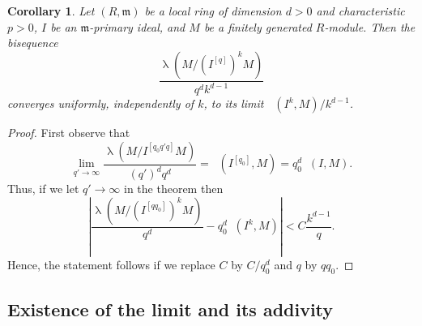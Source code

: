 \documentclass[12pt]{amsart}
\newcommand{\length}{\operatorname{\lambda}}
\newcommand{\mf}[1]{\mathfrak #1}
\DeclareMathOperator{\ehk}{e_{HK}}
\renewcommand{\frq}[1]{{#1}^{[q]}}
\newtheorem{corollary}[theorem]{Corollary}
\theoremstyle{definition}
\theoremstyle{remark}
\numberwithin{theorem}{section}
\numberwithin{equation}{section}
\begin{document}
\begin{corollary}\label{uni}
Let $(R, \mf m)$ be a local ring of dimension $d > 0$ and characteristic $p > 0$, $I$ be an $\mf m$-primary ideal,
and $M$ be a finitely generated $R$-module.
Then the bisequence
\[
\frac{\length (M/(\frq{I})^kM)}{q^d k^{d - 1}}
\]
converges uniformly, independently of $k$, to its limit $\ehk (I^k, M)/k^{d-1}$.
\end{corollary}
\begin{proof}
First observe that 
\[
\lim_{q' \to \infty} \frac{\length (M/I^{[q_0q'q]}M)}{(q')^d q^d}
= \ehk (I^{[q_0]}, M) = q_0^d \ehk (I, M).
\]
Thus, if we let $q' \to \infty$ in the theorem then 
\[
\left |\frac{\length (M/(I^{[qq_0]})^kM)}{q^d} -  q_0^d \ehk (I^k, M)\right| 
< C \frac{k^{d-1}}{q}.
\]
Hence, the statement follows if we replace $C$ by $C/q_0^d$ and $q$ by $qq_0$. 
\end{proof}



\subsection{Existence of the limit and its addivity}
\end{document}
